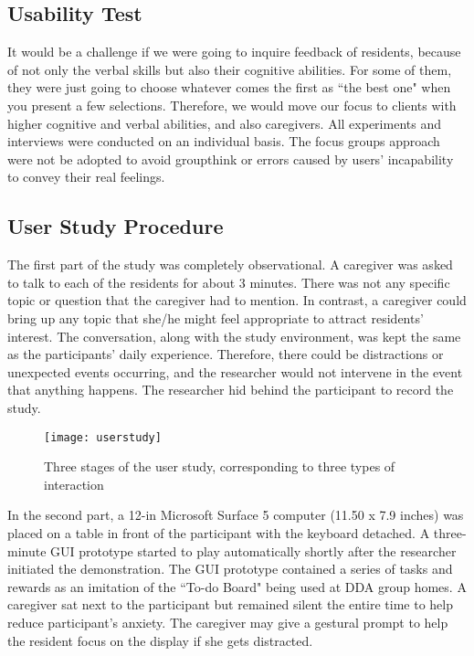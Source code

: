 \documentclass[letterpaper, 10 pt, conference]{ieeeconf}  %
\begin{document}
\subsection{Usability Test}
It would be a challenge if we were going to inquire feedback of residents, because of not only the verbal skills but also their cognitive abilities. For some of them, they were just going to choose whatever comes the first as ``the best one" when you present a few selections. Therefore, we would move our focus to clients with higher cognitive and verbal abilities, and also caregivers. All experiments and interviews were conducted on an individual basis. The focus groups approach were not be adopted to avoid groupthink or errors caused by users' incapability to convey their real feelings.

\subsection{User Study Procedure}

The first part of the study was completely observational. A caregiver was asked to talk to each of the residents for about 3 minutes. There was not any specific topic or question that the caregiver had to mention. In contrast, a caregiver could bring up any topic that she/he might feel appropriate to attract residents' interest. The conversation, along with the study environment, was kept the same as the participants' daily experience. Therefore, there could be distractions or unexpected events occurring, and the researcher would not intervene in the event that anything happens. The researcher hid behind the participant to record the study.

\begin{figure}[hbt]
\centering
\texttt{[image: userstudy]}
\caption{Three stages of the user study, corresponding to three types of interaction}
\label{fig:userstudy}
\end{figure}

In the second part, a 12-in Microsoft Surface 5 computer (11.50 x 7.9 inches) was placed on a table in front of the participant with the keyboard detached. A three-minute GUI prototype started to play automatically shortly after the researcher initiated the demonstration. The GUI prototype contained a series of tasks and rewards as an imitation of the ``To-do Board" being used at DDA group homes. A caregiver sat next to the participant but remained silent the entire time to help reduce participant's  anxiety. The caregiver may give a gestural prompt to help the resident focus on the display if she gets distracted.
\end{document}
